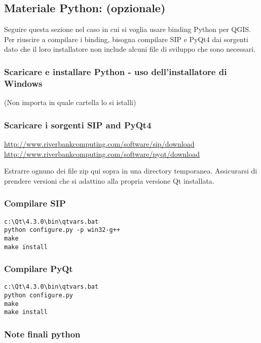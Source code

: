 \subsection{Materiale Python: (opzionale)}
Seguire questa sezione nel caso in cui si voglia usare binding Python per QGIS. Per riuscire a compilare i binding, bisogna compilare SIP e PyQt4 dai sorgenti dato che il loro installatore non include alcuni file di sviluppo che sono necessari.

\subsubsection{Scaricare e installare Python - uso dell'installatore di Windows}
(Non importa in quale cartella lo si istalli)


\subsubsection{Scaricare i sorgenti SIP and PyQt4}
\url{http://www.riverbankcomputing.com/software/sip/download} \\
\url{http://www.riverbankcomputing.com/software/pyqt/download}

Estrarre ognuno dei file zip qui sopra in una directory temporanea. Assicurarsi di prendere versioni che si adattino alla propria versione Qt installata.

\subsubsection{Compilare SIP}
\begin{verbatim}
c:\Qt\4.3.0\bin\qtvars.bat 
python configure.py -p win32-g++ 
make 
make install 
\end{verbatim}

\subsubsection{Compilare PyQt}
\begin{verbatim}
c:\Qt\4.3.0\bin\qtvars.bat 
python configure.py 
make 
make install 
\end{verbatim}

\subsubsection{Note finali python}

